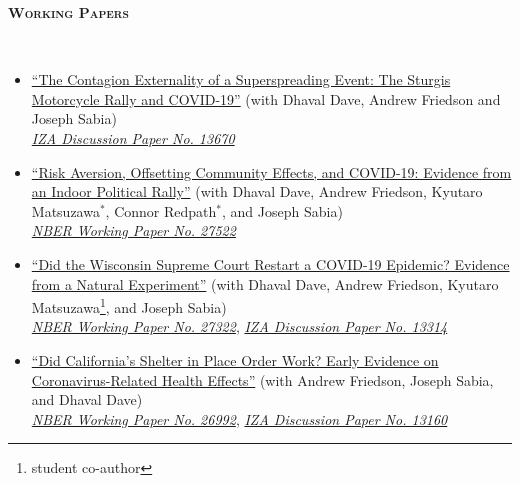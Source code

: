 \documentclass[11pt,english]{article}
\renewcommand{\section}[2]{
        \pagebreak[3]%
        \vspace{1.0\baselineskip}%
        \phantomsection\addcontentsline{toc}{section}{#1}%
        \hspace{0in}%
        {\raggedright \scshape \large \textbf{#1}}%
        \vspace{0.25\baselineskip}#2
}
\begin{document}
\section{Working Papers}\\
\vspace*{-.7cm}
\begin{itemize}[label={},itemindent=-2em,leftmargin=2em]
  \item \href{https://cheps.sdsu.edu/docs/Contagion_Externality_Sturgis_Motorcycle_Rally_9-5-20_Dave_et_al.pdf}{``The Contagion Externality of a Superspreading Event: The Sturgis Motorcycle Rally and COVID-19''} (with Dhaval Dave, Andrew Friedson and Joseph Sabia)%
\\ \href{http://ftp.iza.org/dp13670.pdf}{\emph{ IZA Discussion Paper No. 13670}}

  \item \href{https://cheps.sdsu.edu/docs/CHEPS-Working-Paper-Tulsa-Rally-Jul-9-2020.pdf}{``Risk Aversion, Offsetting Community Effects, and COVID-19:  Evidence from an Indoor Political Rally''} (with Dhaval Dave, Andrew Friedson, Kyutaro Matsuzawa$^*$, Connor Redpath$^*$, and Joseph Sabia)%
  \\ \href{https://www.nber.org/papers/w27522}{\emph{ NBER Working Paper No. 27522}}


 \item \href{https://cheps.sdsu.edu/docs/Did-Wisconsin-Supreme-Court-Restart-an-Epidemic-CHEPS-Working-Paper-5-28-20.pdf}{``Did the Wisconsin Supreme Court Restart a COVID-19 Epidemic? Evidence from a Natural Experiment''} (with Dhaval Dave, Andrew Friedson, Kyutaro Matsuzawa\footnote{student co-author}, and Joseph Sabia)%
 \\ \href{https://www.nber.org/papers/w27322}{\emph{ NBER Working Paper No. 27322}}, \href{https://www.iza.org/publications/dp/13314/did-the-wisconsin-supreme-court-restart-a-covid-19-epidemic-evidence-from-a-natural-experiment}{\emph{ IZA Discussion Paper No. 13314}}

 \item\href{https://cheps.sdsu.edu/docs/CHEPS_Working_Paper_No_2020401_FSMD_April_10_2020.pdf}{``Did California's Shelter in Place Order Work? Early Evidence on Coronavirus-Related Health Effects''} (with Andrew Friedson, Joseph Sabia, and Dhaval Dave) \\
  \href{https://www.nber.org/papers/w26992}{\emph{ NBER Working Paper No. 26992}},
  \href{https://www.iza.org/publications/dp/13160/did-californias-shelter-in-place-order-work-early-coronavirus-related-public-health-effects}{\emph{ IZA Discussion Paper No. 13160}}


\end{itemize}
\end{document}

